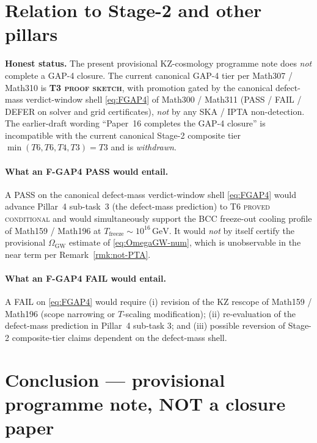 \section{Relation to Stage-2 and other pillars}\label{sec:stage2}

\textbf{Honest status.} The present provisional KZ-cosmology
programme note does \emph{not} complete a GAP-4 closure. The current
canonical GAP-4 tier per Math307 / Math310 is \textbf{T3 \textsc{proof
sketch}}, with promotion gated by the canonical defect-mass
verdict-window shell \eqref{eq:FGAP4} of Math300 / Math311 (PASS /
FAIL / DEFER on solver and grid certificates), \emph{not} by any
SKA / IPTA non-detection. The earlier-draft wording ``Paper~16
completes the GAP-4 closure'' is incompatible with the current
canonical Stage-2 composite tier $\min(T6,T6,T4,T3)=T3$ and is
\emph{withdrawn}.

\paragraph{What an F-GAP4 PASS would entail.}
A PASS on the canonical defect-mass verdict-window shell
\eqref{eq:FGAP4} would advance Pillar~4 sub-task~3 (the defect-mass
prediction) to T6 \textsc{proved conditional} and would simultaneously
support the BCC freeze-out cooling profile of Math159 / Math196 at
$T_{\mathrm{freeze}} \sim 10^{16}\,\mathrm{GeV}$. It would
\emph{not} by itself certify the provisional
$\Omega_{\mathrm{GW}}$ estimate of \eqref{eq:OmegaGW-num}, which is
unobservable in the near term per Remark~\ref{rmk:not-PTA}.

\paragraph{What an F-GAP4 FAIL would entail.}
A FAIL on \eqref{eq:FGAP4} would require
(i) revision of the KZ rescope of Math159 / Math196 (scope narrowing
or $T$-scaling modification);
(ii) re-evaluation of the defect-mass prediction in Pillar~4
sub-task 3; and (iii) possible reversion of Stage-2 composite-tier
claims dependent on the defect-mass shell.

\section{Conclusion --- provisional programme note, NOT a closure
paper}\label{sec:conclusion}

